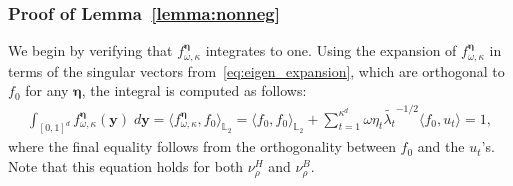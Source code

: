 \documentclass[twoside,11pt]{article}
\newcommand{\Ell}{\mathbb{L}}
\newcommand{\EllTwo}{\Ell_2} %
\newcommand{\vectorize}[1]{\mathbf{#1}}
\newcommand{\dimDensity}{d} %
\newcommand{\binNum}{\kappa}           %
\begin{document}
\begin{appendix}
	\subsubsection{Proof of Lemma~\ref{lemma:nonneg}}
	We begin by verifying that \( f^{\boldsymbol{\eta}}_{\omega, \binNum} \) integrates to one. Using the expansion of \( f^{\boldsymbol{\eta}}_{\omega, \binNum} \) in terms of the singular vectors from~\eqref{eq:eigen_expansion}, which are orthogonal to \( f_0 \) for any \( \boldsymbol{\eta} \), the integral is computed as follows:
	\begin{align*}
		\int_{[0,1]^\dimDensity}
		f^{\boldsymbol{\eta}}_{\omega, \binNum}(\vectorize{y})
		\; d \vectorize{y}
		=%
		\langle
		f^{\boldsymbol{\eta}}_{\omega, \binNum},
		f_0
		\rangle_{\EllTwo}
		=
		\langle
		f_0, f_0
		\rangle_{\EllTwo}
		+
		\sum_{t = 1}^{\binNum^\dimDensity}
		\omega \eta_t \tilde{\lambda_t}^{-1/2}
		\langle
		f_0, u_t
		\rangle
		= 1,
	\end{align*}
	where the final equality follows from the orthogonality between \( f_0 \) and the \( u_t \)'s. Note that this equation holds for both \( \nu_\rho^H \) and \( \nu_\rho^B \).
	

\end{appendix}
\end{document}
